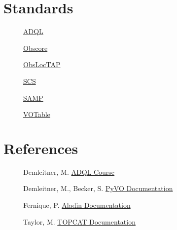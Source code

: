 \documentclass[twoside]{article}[12pt]
\begin{document}
\section{Standards}
\begin{description}

\item[]\href{http://www.ivoa.net/documents/REC/ADQL/ADQL-20081030.pdf}{ADQL}

\item[]\href{https://www.ivoa.net/documents/ObsCore/}{Obscore}

\item[]
\href{https://www.ivoa.net/documents/ObsLocTAP/index.html}{ObsLocTAP}

\item[]
\href{https://www.ivoa.net/documents/latest/ConeSearch.html}{SCS}

\item[] \href{https://www.ivoa.net/documents/SAMP/}{SAMP}

\item[]\href{http://www.ivoa.net/documents/VOTable/20130920/REC-VOTable-1.3-20130920.html}{VOTable}


\end{description}

\section{References}

\begin{description}

\item[]Demleitner, M. \href{http://docs.g-vo.org/adql/html/}{ADQL-Course}

\item[]Demleitner, M., Becker, S.
\href{https://pyvo.readthedocs.io/en/latest/}{PyVO Documentation}

\item[]Fernique, P.
\href{http://aladin.u-strasbg.fr/java/AladinManual6.pdf}{Aladin
Documentation}

\item[]Taylor, M.
\href{http://www.star.bris.ac.uk/~mbt/topcat/#docs}{TOPCAT Documentation}

\end{description}
\end{document}
